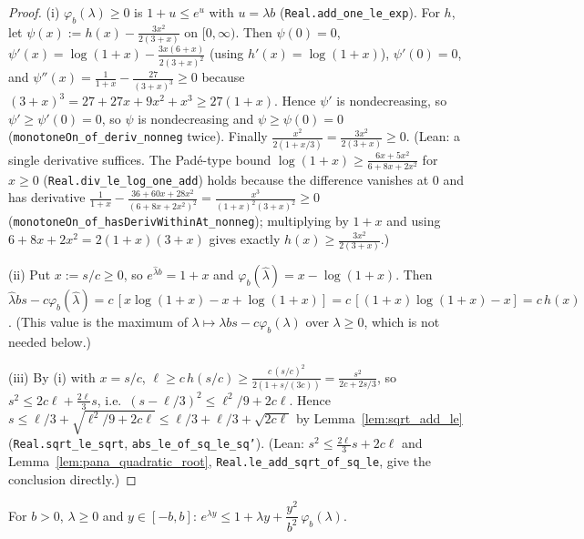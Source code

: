\begin{proof}
\leanok
(i) $\varphi_b(\lambda) \ge 0$ is $1 + u \le e^u$ with $u = \lambda b$ (\texttt{Real.add\_one\_le\_exp}).
For $h$, let $\psi(x) := h(x) - \frac{3x^2}{2(3 + x)}$ on $[0, \infty)$. Then $\psi(0) = 0$,
$\psi'(x) = \log(1 + x) - \frac{3x(6 + x)}{2(3 + x)^2}$ (using $h'(x) = \log(1 + x)$), $\psi'(0) = 0$,
and $\psi''(x) = \frac1{1 + x} - \frac{27}{(3 + x)^3} \ge 0$ because
$(3 + x)^3 = 27 + 27x + 9x^2 + x^3 \ge 27(1 + x)$. Hence $\psi'$ is nondecreasing, so
$\psi' \ge \psi'(0) = 0$, so $\psi$ is nondecreasing and $\psi \ge \psi(0) = 0$
(\texttt{monotoneOn\_of\_deriv\_nonneg} twice). Finally $\frac{x^2}{2(1 + x/3)} = \frac{3x^2}{2(3 + x)} \ge 0$.
(Lean: a single derivative suffices. The Padé-type bound
$\log(1 + x) \ge \frac{6x + 5x^2}{6 + 8x + 2x^2}$ for $x \ge 0$ (\texttt{Real.div\_le\_log\_one\_add})
holds because the difference vanishes at $0$ and has derivative
$\frac1{1 + x} - \frac{36 + 60x + 28x^2}{(6 + 8x + 2x^2)^2} = \frac{x^3}{(1 + x)^2(3 + x)^2} \ge 0$
(\texttt{monotoneOn\_of\_hasDerivWithinAt\_nonneg}); multiplying by $1 + x$ and using
$6 + 8x + 2x^2 = 2(1 + x)(3 + x)$ gives exactly $h(x) \ge \frac{3x^2}{2(3 + x)}$.)

(ii) Put $x := s/c \ge 0$, so $e^{\hat\lambda b} = 1 + x$ and $\varphi_b(\hat\lambda) = x - \log(1 + x)$.
Then $\hat\lambda b s - c\varphi_b(\hat\lambda) = c\,[x \log(1 + x) - x + \log(1 + x)] = c\,[(1 + x)\log(1 + x) - x] = c\, h(x)$.
(This value is the maximum of $\lambda \mapsto \lambda b s - c\varphi_b(\lambda)$ over $\lambda \ge 0$,
which is not needed below.)

(iii) By (i) with $x = s/c$, $\ell \ge c\, h(s/c) \ge \frac{c\, (s/c)^2}{2(1 + s/(3c))} = \frac{s^2}{2c + 2s/3}$,
so $s^2 \le 2c\ell + \frac{2\ell}{3} s$, i.e.\ $(s - \ell/3)^2 \le \ell^2/9 + 2c\ell$. Hence
$s \le \ell/3 + \sqrt{\ell^2/9 + 2c\ell} \le \ell/3 + \ell/3 + \sqrt{2c\ell}$ by
Lemma~\ref{lem:sqrt_add_le} (\texttt{Real.sqrt\_le\_sqrt}, \texttt{abs\_le\_of\_sq\_le\_sq'}).
(Lean: $s^2 \le \frac{2\ell}{3} s + 2c\ell$ and Lemma~\ref{lem:pana_quadratic_root},
\texttt{Real.le\_add\_sqrt\_of\_sq\_le}, give the conclusion directly.)
\end{proof}

\begin{lemma}\label{lem:pconc_exp_taylor_bound}
\leanok
For $b > 0$, $\lambda \ge 0$ and $y \in [-b, b]$:
$e^{\lambda y} \le 1 + \lambda y + \dfrac{y^2}{b^2}\, \varphi_b(\lambda)$.
\end{lemma}

